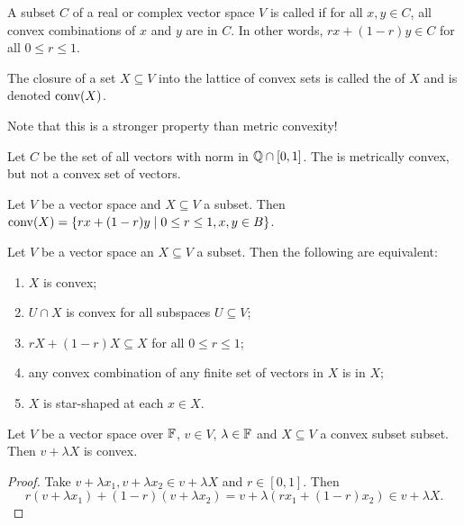\begin{definition}
A subset $C$ of a real or complex vector space $V$ is called  if for all $x,y\in C$, all convex combinations of $x$ and $y$ are in $C$. In other words, $rx + (1-r)y\in C$ for all $0\leq r \leq 1$.

The closure of a set $X\subseteq V$ into the lattice of convex sets is called the  of $X$ and is denoted $\operatorname{conv}(X)$.
\end{definition}
Note that this is a stronger property than metric convexity!
\begin{example}
Let $C$ be the set of all vectors with norm in $\mathbb{Q}\cap [0,1]$. The is metrically convex, but not a convex set of vectors.
\end{example}

\begin{lemma}
Let $V$ be a vector space and $X\subseteq V$ a subset. Then $\operatorname{conv}(X) = \left\{ rx + (1-r)y \;\middle|\; 0\leq r \leq 1, x,y\in B \right\}$.
\end{lemma}

\begin{lemma} \label{convexCriteria}
Let $V$ be a vector space an $X\subseteq V$ a subset. Then the following are equivalent:
\begin{enumerate}
\item $X$ is convex;
\item $U\cap X$ is convex for all subspaces $U\subseteq V$;
\item $rX + (1-r)X \subseteq X$ for all $0\leq r \leq 1$;
\item any convex combination of any finite set of vectors in $X$ is in $X$;
\item $X$ is star-shaped at each $x\in X$.
\end{enumerate}
\end{lemma}

\begin{lemma} \label{translationScalingConvexSet}
Let $V$ be a vector space over $\mathbb{F}$, $v\in V$, $\lambda\in \mathbb{F}$ and $X\subseteq V$ a convex subset subset. Then $v+\lambda X$ is convex.
\end{lemma}
\begin{proof}
Take $v+\lambda x_1, v+\lambda x_2 \in v+\lambda X$ and $r\in [0,1]$. Then
\[ r(v+\lambda x_1) + (1-r)(v+\lambda x_2) = v + \lambda(rx_1 + (1-r)x_2) \in v+\lambda X. \]
\end{proof}

